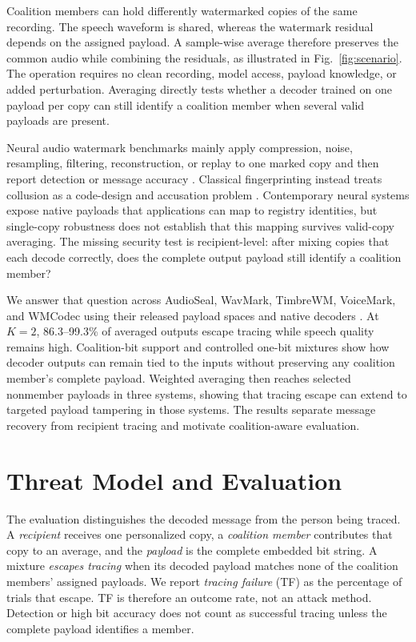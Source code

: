 \documentclass{article}
\begin{document}
Coalition members can hold differently watermarked copies of the same recording. The speech waveform is shared, whereas the watermark residual depends on the assigned payload. A sample-wise average therefore preserves the common audio while combining the residuals, as illustrated in Fig.~\ref{fig:scenario}. The operation requires no clean recording, model access, payload knowledge, or added perturbation. Averaging directly tests whether a decoder trained on one payload per copy can still identify a coalition member when several valid payloads are present.

Neural audio watermark benchmarks mainly apply compression, noise, resampling, filtering, reconstruction, or replay to one marked copy and then report detection or message accuracy \cite{liu2024audiomarkbench,wang2024draw,li2024ideaw}. Classical fingerprinting instead treats collusion as a code-design and accusation problem \cite{cox1997spread,trappe2003anticollusion,boneh1998fingerprinting,tardos2003fingerprint,celik2004prewarping,tirkel2011audio}. Contemporary neural systems expose native payloads that applications can map to registry identities, but single-copy robustness does not establish that this mapping survives valid-copy averaging. The missing security test is recipient-level: after mixing copies that each decode correctly, does the complete output payload still identify a coalition member?

We answer that question across AudioSeal, WavMark, TimbreWM, VoiceMark, and WMCodec using their released payload spaces and native decoders \cite{sanroman2024audioseal,chen2023wavmark,liu2024timbre,li2025voicemark,zhou2024wmcodec}. At $K=2$, 86.3--99.3\% of averaged outputs escape tracing while speech quality remains high. Coalition-bit support and controlled one-bit mixtures show how decoder outputs can remain tied to the inputs without preserving any coalition member's complete payload. Weighted averaging then reaches selected nonmember payloads in three systems, showing that tracing escape can extend to targeted payload tampering in those systems. The results separate message recovery from recipient tracing and motivate coalition-aware evaluation.

\section{Threat Model and Evaluation}
\label{sec:evaluation}

The evaluation distinguishes the decoded message from the person being traced. A \emph{recipient} receives one personalized copy, a \emph{coalition member} contributes that copy to an average, and the \emph{payload} is the complete embedded bit string. A mixture \emph{escapes tracing} when its decoded payload matches none of the coalition members' assigned payloads. We report \emph{tracing failure} (TF) as the percentage of trials that escape. TF is therefore an outcome rate, not an attack method. Detection or high bit accuracy does not count as successful tracing unless the complete payload identifies a member.
\end{document}
